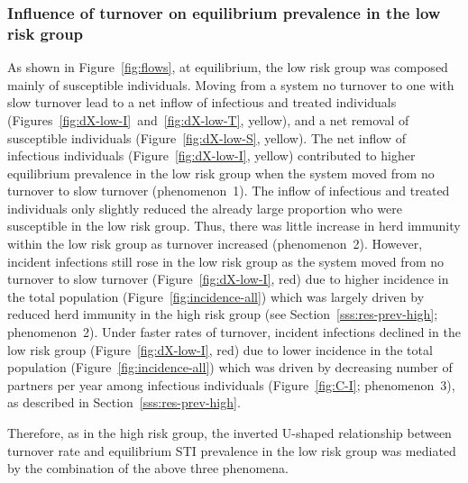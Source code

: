 \subsubsection{Influence of turnover on equilibrium prevalence in the low risk group}
\label{sss:res-prev-low}
As shown in Figure~\ref{fig:flows}, at equilibrium, the low risk group was
composed mainly of susceptible individuals.
Moving from a system no turnover to one with slow turnover
lead to a net inflow of infectious and treated individuals
(Figures~\ref{fig:dX-low-I}~and~\ref{fig:dX-low-T}, yellow),
and a net removal of susceptible individuals
(Figure~\ref{fig:dX-low-S}, yellow).
The net inflow of infectious individuals
(Figure~\ref{fig:dX-low-I}, yellow) contributed to
higher equilibrium prevalence in the low risk group
when the system moved from no turnover to slow turnover
(phenomenon~1).
The inflow of infectious and treated individuals
only slightly reduced the already large proportion who were susceptible
in the low risk group.
Thus, there was little increase in herd immunity within the low risk group
as turnover increased
(phenomenon~2).
However, incident infections still rose in the low risk group
as the system moved from no turnover to slow turnover
(Figure~\ref{fig:dX-low-I}, red)
due to higher incidence in the total population (Figure~\ref{fig:incidence-all})
which was largely driven by
reduced herd immunity in the high risk group
(see Section~\ref{sss:res-prev-high}; phenomenon~2).
Under faster rates of turnover,
incident infections declined in the low risk group
(Figure~\ref{fig:dX-low-I}, red)
due to lower incidence in the total population
(Figure~\ref{fig:incidence-all})
which was driven by
decreasing number of partners per year among infectious individuals
(Figure~\ref{fig:C-I}; phenomenon~3),
as described in Section~\ref{sss:res-prev-high}.
\par
Therefore, as in the high risk group,
the inverted U-shaped relationship between turnover rate
and equilibrium STI prevalence in the low risk group was mediated
by the combination of the above three phenomena.
